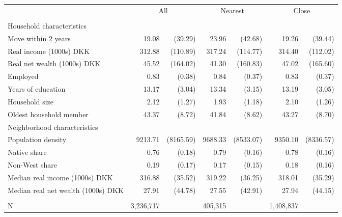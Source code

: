 \begin{tabular}{lrrrrrr}
\toprule
 & \multicolumn{2}{c}{All} & \multicolumn{2}{c}{Nearest} & \multicolumn{2}{c}{Close} \\ 
\cmidrule(lr){2-3} \cmidrule(lr){4-5} \cmidrule(lr){6-7}
 &  &  &  &  &  &  \\ 
\midrule
\multicolumn{7}{l}{Household characteristics} \\ 
\midrule
Move within 2 years & 19.08 & (39.29) & 23.96 & (42.68) & 19.26 & (39.44) \\ 
Real income (1000s) DKK & 312.88 & (110.89) & 317.24 & (114.77) & 314.40 & (112.02) \\ 
Real net wealth (1000s) DKK & 45.52 & (164.02) & 41.30 & (160.83) & 47.02 & (165.60) \\ 
Employed & 0.83 & (0.38) & 0.84 & (0.37) & 0.83 & (0.37) \\ 
Years of education & 13.17 & (3.04) & 13.34 & (3.15) & 13.19 & (3.05) \\ 
Household size & 2.12 & (1.27) & 1.93 & (1.18) & 2.10 & (1.26) \\ 
Oldest household member & 43.37 & (8.72) & 41.84 & (8.62) & 43.27 & (8.70) \\ 
\midrule
\multicolumn{7}{l}{Neighborhood characteristics} \\ 
\midrule
Population density & 9213.71 & (8165.59) & 9688.33 & (8533.07) & 9350.10 & (8336.57) \\ 
Native share & 0.76 & (0.18) & 0.79 & (0.16) & 0.78 & (0.16) \\ 
Non-West share & 0.19 & (0.17) & 0.17 & (0.15) & 0.18 & (0.16) \\ 
Median real income (1000s) DKK & 316.88 & (35.52) & 319.22 & (36.25) & 318.01 & (35.29) \\ 
Median real net wealth (1000s) DKK & 27.91 & (44.78) & 27.55 & (42.91) & 27.94 & (44.15) \\ 
\midrule
\multicolumn{7}{l}{\vspace*{-5mm}} \\ 
N & 3,236,717 &  & 405,315 &  & 1,408,837 &  \\ 
\bottomrule
\end{tabular}
